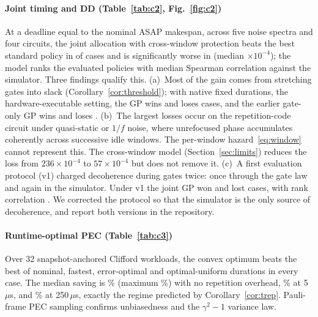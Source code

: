 \documentclass[10pt,journal]{IEEEtran}
\theoremstyle{remark}
\begin{document}
\paragraph*{Joint timing and DD (Table~\ref{tab:c2}, Fig.~\ref{fig:c2})}
At a deadline equal to the nominal ASAP makespan, across five noise spectra and four circuits, the joint
allocation with cross-window protection beats the best standard policy in \CTwoWins{} of \CTwoCases{} cases and
is significantly worse in \CTwoLosses{} (median \CTwoMedian$\times10^{-4}$); the model ranks the evaluated
policies with median Spearman correlation \CTwoRank{} against the simulator. Three findings qualify this.
(a)~Most of the gain comes from stretching gates into slack (Corollary~\ref{cor:threshold}); with native fixed
durations, the hardware-executable setting, the GP wins \CTwoFixedWins{} and loses \CTwoFixedLosses{} cases, and
the earlier gate-only GP wins \CTwoGateWins{} and loses \CTwoGateLosses{}. (b)~The largest losses occur on the
repetition-code circuit under quasi-static or $1/f$ noise, where unrefocused phase accumulates coherently across
successive idle windows. The per-window hazard~\eqref{eq:window} cannot represent this. The cross-window model
(Section~\ref{sec:limits}) reduces the loss from $236\times10^{-4}$ to $57\times10^{-4}$ but does not remove it.
(c)~A first evaluation protocol (v1) charged decoherence during gates twice: once through the gate law and
again in the simulator. Under v1 the joint GP won \CTwoVoneWins{} and lost \CTwoVoneLosses{} cases, with rank
correlation \CTwoVoneRank{}. We corrected the protocol so that the simulator is the only source of decoherence,
and report both versions in the repository.

\paragraph*{Runtime-optimal PEC (Table~\ref{tab:c3})}
Over 32 snapshot-anchored Clifford workloads, the convex optimum beats the best of nominal, fastest,
error-optimal and optimal-uniform durations in every case. The median saving is \CThreeZero\% (maximum
\CThreeZeroMax\%) with no repetition overhead, \CThreeFive\% at 5\,$\mu$s, and \CThreeIBM\% at 250\,$\mu$s,
exactly the regime predicted by Corollary~\ref{cor:trep}. Pauli-frame PEC sampling confirms unbiasedness and
the $\gamma^2-1$ variance law.
\end{document}
